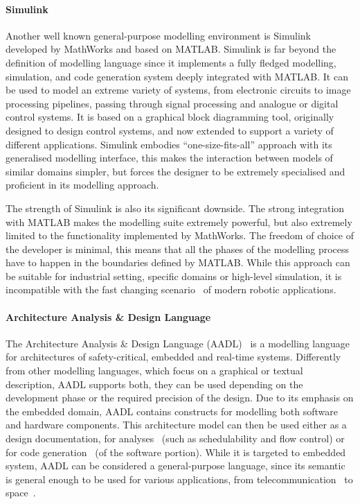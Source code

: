 \paragraph{Simulink} Another well known general-purpose modelling environment is Simulink~\cite{dabney2004mastering} developed by MathWorks and based on MATLAB. Simulink is far beyond the definition of modelling language since it implements a fully fledged modelling, simulation, and code generation system deeply integrated with MATLAB. It can be used to model an extreme variety of systems, from electronic circuits to image processing pipelines, passing through signal processing and analogue or digital control systems. It is based on a graphical block diagramming tool, originally designed to design control systems, and now extended to support a variety of different applications. Simulink embodies ``one-size-fits-all'' approach with its generalised modelling interface, this makes the interaction between models of similar domains simpler, but forces the designer to be extremely specialised and proficient in its modelling approach.

The strength of Simulink is also its significant downside. The strong integration with MATLAB makes the modelling suite extremely powerful, but also extremely limited to the functionality implemented by MathWorks. The freedom of choice of the developer is minimal, this means that all the phases of the modelling process have to happen in the boundaries defined by MATLAB. While this approach can be suitable for industrial setting, specific domains or high-level simulation, it is incompatible with the fast changing scenario~\cite{cousins2011exponential} of modern robotic applications.

\paragraph{Architecture Analysis \& Design Language} The  Architecture Analysis \& Design Language (AADL)~\cite{feiler2006architecture} is a modelling language for architectures of safety-critical, embedded and real-time systems. Differently from other modelling languages, which focus on a graphical or textual description, AADL supports both, they can be used depending on the development phase or the required precision of the design. Due to its emphasis on the embedded domain, AADL contains constructs for modelling both software and hardware components. This architecture model can then be used either as a design documentation, for analyses~\cite{feiler2004open} (such as schedulability and flow control) or for code generation~\cite{hugues2008prototype} (of the software portion). While it is targeted to embedded system, AADL can be considered a general-purpose language, since its semantic is general enough to be used for various applications, from telecommunication~\cite{delanote2008using} to space~\cite{perrotin2011taste}.

